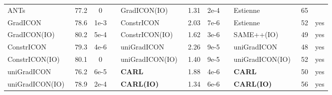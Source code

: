 \begin{table*}[htp]
\begin{adjustbox}{width=\textwidth,center}
\begin{tabular}{lccp{1em}lccp{1em}lcc}
			ANTs~\cite{avants2008symmetric}                           & 77.2           & 0                      & & GradICON(IO)~\cite{tian2022}                            & 1.31             & 2e-4                                          & & Estienne~\cite{estienne2021deep}                              & 65                                              \\
			GradICON~\cite{greer2023inverse}                          & 78.6           & 1e-3                   & & ConstrICON~\cite{greer2023inverse}                      & 2.03             & 7e-6                                          & & Estienne~\cite{estienne2021deep}                              & 52             & yes                            \\
			GradICON(IO)~\cite{greer2023inverse}                      & 80.2           & 5e-4                   & & ConstrICON(IO)~\cite{greer2023inverse}                  & 1.62             & 3e-6                                          & & SAME++(IO)~\cite{Tian2023SAMEAS}                              & 49             & yes                            \\
			ConstrICON~\cite{greer2023inverse}                        & 79.3           & 4e-6                   & & uniGradICON~\cite{tian2024unigradicon}                  & 2.26             & 9e-5                                          & & uniGradICON    ~\cite{tian2024unigradicon}                    & 48             & yes                            \\
			ConstrICON(IO)~\cite{greer2023inverse}                    & 80.1           & 0                      & & uniGradICON(IO)~\cite{tian2024unigradicon}              & 1.40             & 9e-5                                          & & uniGradICON(IO)~\cite{tian2024unigradicon}                    & 52             & yes                            \\
			uniGradICON~\cite{tian2024unigradicon}                    & 76.2           & 6e-5                   & & \textbf{CARL}                                           & 1.88             & 4e-6                                          & & \textbf{CARL}                                                 & 50             & yes                            \\
			uniGradICON(IO)~\cite{tian2024unigradicon}                & 78.9           & 2e-4                   & & \textbf{CARL(IO)}                                       & 1.34             & 6e-6                                          & & \textbf{CARL(IO)}                                             & 56             & yes                            \\

\end{tabular}
\end{adjustbox}
\end{table*}
